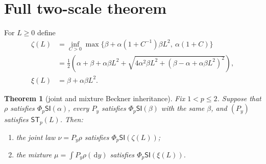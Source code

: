 \documentclass[11pt]{article}
\newtheorem{theorem}{Theorem}
\theoremstyle{remark}
\newcommand{\dd}{\,\mathrm d}
\newcommand{\ST}{\mathsf{ST}_p}
\begin{document}
\section{Full two-scale theorem}

For $L\geq0$ define
\begin{align}
 \zeta(L)
 &=\inf_{C>0}\max\bigl\{
  \beta+\alpha(1+C^{-1})\beta L^2,\ \alpha(1+C)\bigr\}
 \label{eq:zeta-inf}\\
 &=\frac12\left(\alpha+\beta+\alpha\beta L^2
 +\sqrt{4\alpha^2\beta L^2+
 (\beta-\alpha+\alpha\beta L^2)^2}\right),
 \label{eq:zeta-closed}\\
 \xi(L)&=\beta+\alpha\beta L^2.
 \label{eq:xi}
\end{align}

\begin{theorem}[joint and mixture Beckner inheritance]
\label{thm:main}
Fix $1<p\leq2$.  Suppose that $\rho$ satisfies
$\Phi_p\mathsf{SI}(\alpha)$, every $P_y$ satisfies
$\Phi_p\mathsf{SI}(\beta)$ with the same $\beta$, and $(P_y)$ satisfies
$\ST(L)$.  Then:
\begin{enumerate}[label=(\roman*)]
 \item the joint law $\nu=P_y\rho$ satisfies
 $\Phi_p\mathsf{SI}(\zeta(L))$;
 \item the mixture $\mu=\int P_y\rho(\dd y)$ satisfies
 $\Phi_p\mathsf{SI}(\xi(L))$.
\end{enumerate}
\end{theorem}
\end{document}

